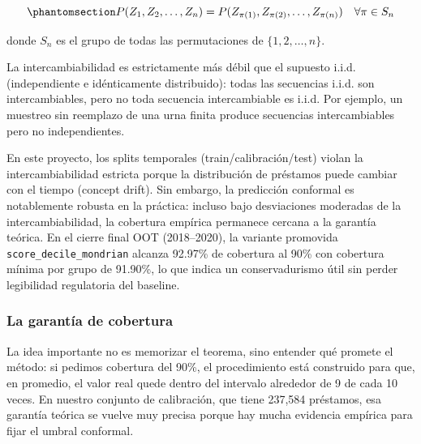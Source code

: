 \documentclass[
  spanish,
  11pt,
  letterpaper,
]{scrbook}
\theoremstyle{plain}
\theoremstyle{remark}
\begin{document}
\begin{equation}\protect\phantomsection\label{eq-exchangeability}{
P(Z_1, Z_2, \ldots, Z_n) = P(Z_{\pi(1)}, Z_{\pi(2)}, \ldots, Z_{\pi(n)}) \quad \forall \pi \in S_n
}\end{equation}

donde \(S_n\) es el grupo de todas las permutaciones de
\(\{1, 2, \ldots, n\}\).

La intercambiabilidad es estrictamente más débil que el supuesto i.i.d.
(independiente e idénticamente distribuido): todas las secuencias i.i.d.
son intercambiables, pero no toda secuencia intercambiable es i.i.d. Por
ejemplo, un muestreo sin reemplazo de una urna finita produce secuencias
intercambiables pero no independientes.

\begin{tcolorbox}[enhanced jigsaw, arc=.35mm, bottomrule=.15mm, bottomtitle=1mm, breakable, colback=white, colbacktitle=quarto-callout-tip-color!10!white, colframe=quarto-callout-tip-color-frame, coltitle=black, left=2mm, leftrule=.75mm, opacityback=0, opacitybacktitle=0.6, rightrule=.15mm, title=\textcolor{quarto-callout-tip-color}{\faLightbulb}\hspace{0.5em}{Intercambiabilidad en datos de crédito}, titlerule=0mm, toprule=.15mm, toptitle=1mm]

En este proyecto, los splits temporales (train/calibración/test) violan
la intercambiabilidad estricta porque la distribución de préstamos puede
cambiar con el tiempo (concept drift). Sin embargo, la predicción
conformal es notablemente robusta en la práctica: incluso bajo
desviaciones moderadas de la intercambiabilidad, la cobertura empírica
permanece cercana a la garantía teórica. En el cierre final OOT
(2018--2020), la variante promovida \texttt{score\_decile\_mondrian}
alcanza 92.97\% de cobertura al 90\% con cobertura mínima por grupo de
91.90\%, lo que indica un conservadurismo útil sin perder legibilidad
regulatoria del baseline.

\end{tcolorbox}

\subsubsection{La garantía de cobertura}\label{sec-coverage-guarantee}

La idea importante no es memorizar el teorema, sino entender qué promete
el método: si pedimos cobertura del 90\%, el procedimiento está
construido para que, en promedio, el valor real quede dentro del
intervalo alrededor de 9 de cada 10 veces. En nuestro conjunto de
calibración, que tiene 237,584 préstamos, esa garantía teórica se vuelve
muy precisa porque hay mucha evidencia empírica para fijar el umbral
conformal.
\end{document}
